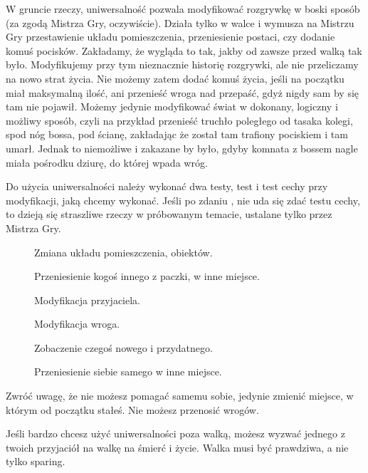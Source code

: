W gruncie rzeczy, uniwersalność pozwala modyfikować rozgrywkę w boski sposób (za zgodą Mistrza Gry, oczywiście).
Działa tylko w walce i wymusza na Mistrzu Gry przestawienie układu pomieszczenia, przeniesienie postaci, czy dodanie komuś pocisków.
Zakładamy, że wygląda to tak, jakby od zawsze przed walką tak było. Modyfikujemy przy tym nieznacznie historię rozgrywki, ale nie przeliczamy na nowo strat życia.
Nie możemy zatem dodać komuś życia, jeśli na początku miał maksymalną ilość, ani przenieść wroga nad przepaść, gdyż nigdy sam by się tam nie pojawił.
Możemy jedynie modyfikować świat w dokonany, logiczny i możliwy sposób, czyli na przykład przenieść truchło poległego od tasaka kolegi, spod nóg bossa, pod ścianę, zakładając że został tam trafiony pociskiem i tam umarł.
Jednak to niemożliwe i zakazane by było, gdyby komnata z bossem nagle miała pośrodku dziurę, do której wpada wróg.

Do użycia uniwersalności należy wykonać dwa testy, test \abu{} i test cechy przy modyfikacji, jaką chcemy wykonać.
Jeśli po zdaniu \abu{}, nie uda się zdać testu cechy, to dzieją się straszliwe rzeczy w próbowanym temacie, ustalane tylko przez Mistrza Gry.
\begin{description}
	\item[\abi{}] Zmiana układu pomieszczenia, obiektów.
	\item[\abs{}] Przeniesienie kogoś innego z paczki, w inne miejsce.
	\item[\abt{}] Modyfikacja przyjaciela.
	\item[\abh{}] Modyfikacja wroga.
	\item[\abp{}] Zobaczenie czegoś nowego i przydatnego.
	\item[\aba{}] Przeniesienie siebie samego w inne miejsce.
\end{description}
Zwróć uwagę, że nie możesz pomagać samemu sobie, jedynie zmienić miejsce, w którym od początku stałeś.
Nie możesz przenosić wrogów.

Jeśli bardzo chcesz użyć uniwersalności poza walką, możesz wyzwać jednego z twoich przyjaciół na walkę na śmierć i życie.
Walka musi być prawdziwa, a nie tylko sparing.







